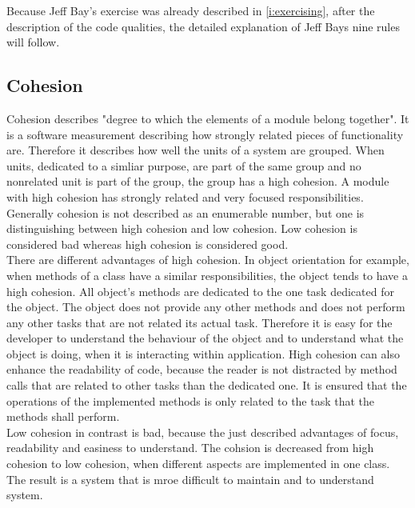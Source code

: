 Because Jeff Bay's exercise was already described in \ref{i:exercising}, after the description of the code qualities, the detailed explanation of Jeff Bays nine rules will follow. 

\subsection{Cohesion}
\label{cohesion}
Cohesion describes "degree to which the elements of a module belong together"\cite{cohesionBook}. It is a software measurement describing how strongly related pieces of functionality are. Therefore it describes how well the units of a system are grouped. When units, dedicated to a simliar purpose, are part of the same group and no nonrelated unit is part of the group, the group has a high cohesion. A module with high cohesion has strongly related and very focused responsibilities\cite{wiki:cohesion}. Generally cohesion is not described as an enumerable number, but one is distinguishing between high cohesion and low cohesion. Low cohesion is considered bad whereas high cohesion is considered good.\\

There are different advantages of high cohesion. In object orientation for example, when methods of a class have a similar responsibilities, the object tends to have a high cohesion. All object's methods are dedicated to the one task dedicated for the object. The object does not provide any other methods and does not perform any other tasks that are not related its actual task. Therefore it is easy for the developer to understand the behaviour of the object and to understand what the object is doing, when it is interacting within application. High cohesion can also enhance the readability of code, because the reader is not distracted by method calls that are related to other tasks than the dedicated one. It is ensured that the operations of the implemented methods is only related to the task that the methods shall perform. \\

Low cohesion in contrast is bad, because the just described advantages of focus, readability and easiness to understand. The cohsion is decreased from high cohesion to low cohesion, when different aspects are implemented in one class. The result is a system that is mroe difficult to maintain and to understand system. 


